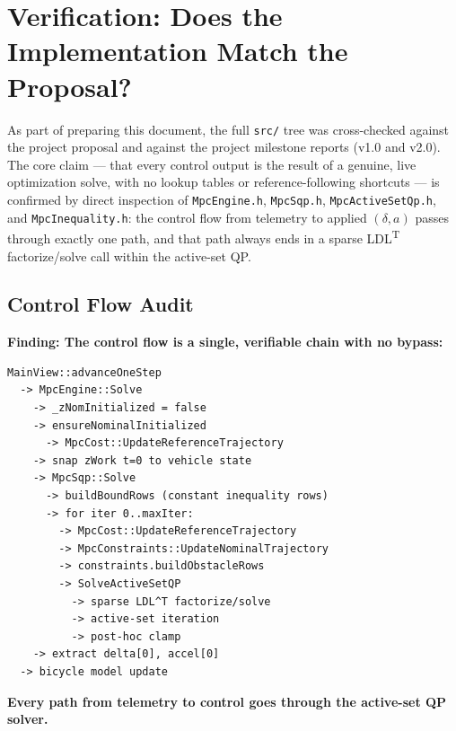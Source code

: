 ﻿\documentclass[11pt,a4paper]{article}
\begin{document}
\section{Verification: Does the Implementation Match the Proposal?}\label{sec:verification}

As part of preparing this document, the full \texttt{src/} tree was cross-checked against the project proposal and against the project milestone reports (v1.0 and v2.0). The core claim --- that every control output is the result of a genuine, live optimization solve, with no lookup tables or reference-following shortcuts --- is confirmed by direct inspection of \texttt{MpcEngine.h}, \texttt{MpcSqp.h}, \texttt{MpcActiveSetQp.h}, and \texttt{MpcInequality.h}: the control flow from telemetry to applied $(\delta,a)$ passes through exactly one path, and that path always ends in a sparse LDL\textsuperscript{T} factorize/solve call within the active-set QP.

\subsection{Control Flow Audit}

\textbf{Finding: The control flow is a single, verifiable chain with no bypass:}

\begin{lstlisting}
MainView::advanceOneStep
  -> MpcEngine::Solve
    -> _zNomInitialized = false
    -> ensureNominalInitialized
      -> MpcCost::UpdateReferenceTrajectory
    -> snap zWork t=0 to vehicle state
    -> MpcSqp::Solve
      -> buildBoundRows (constant inequality rows)
      -> for iter 0..maxIter:
        -> MpcCost::UpdateReferenceTrajectory
        -> MpcConstraints::UpdateNominalTrajectory
        -> constraints.buildObstacleRows
        -> SolveActiveSetQP
          -> sparse LDL^T factorize/solve
          -> active-set iteration
          -> post-hoc clamp
    -> extract delta[0], accel[0]
  -> bicycle model update
\end{lstlisting}

\textbf{Every path from telemetry to control goes through the active-set QP solver.}
\end{document}
